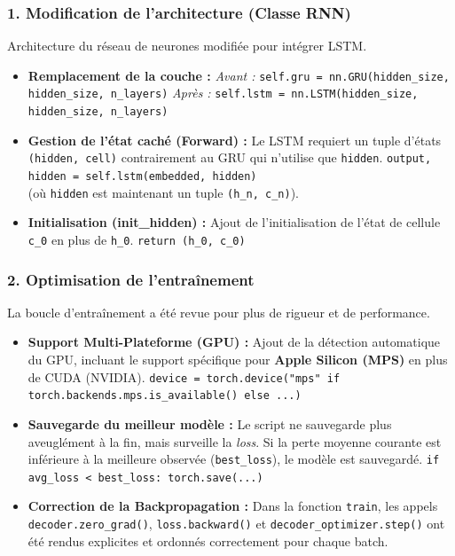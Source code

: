 \documentclass[a4paper]{article}
\begin{document}
\subsubsection{1. Modification de l'architecture (Classe RNN)}
Architecture du réseau de neurones modifiée pour intégrer LSTM.
\begin{itemize}
    \item \textbf{Remplacement de la couche :}\newline
    \textit{Avant :} \lstinline|self.gru = nn.GRU(hidden_size, hidden_size, n_layers)|\newline
    \textit{Après :} \lstinline|self.lstm = nn.LSTM(hidden_size, hidden_size, n_layers)|
    \item \textbf{Gestion de l'état caché (Forward) :}\newline
    Le LSTM requiert un tuple d'états \lstinline|(hidden, cell)| contrairement au GRU qui n'utilise que \lstinline|hidden|.\newline
    \lstinline|output, hidden = self.lstm(embedded, hidden)| \\ (où \lstinline|hidden| est maintenant un tuple \lstinline|(h_n, c_n)|).
    \item \textbf{Initialisation (init\_hidden) :}\newline
    Ajout de l'initialisation de l'état de cellule \lstinline|c_0| en plus de \lstinline|h_0|.\newline
    \lstinline|return (h_0, c_0)|
\end{itemize}

\subsubsection{2. Optimisation de l'entraînement}
La boucle d'entraînement a été revue pour plus de rigueur et de performance.
\begin{itemize}
    \item \textbf{Support Multi-Plateforme (GPU) :}\newline
    Ajout de la détection automatique du GPU, incluant le support spécifique pour \textbf{Apple Silicon (MPS)} en plus de CUDA (NVIDIA).\newline
    \lstinline|device = torch.device("mps" if torch.backends.mps.is_available() else ...)|
    \item \textbf{Sauvegarde du meilleur modèle :}\newline
    Le script ne sauvegarde plus aveuglément à la fin, mais surveille la \textit{loss}. Si la perte moyenne courante est inférieure à la meilleure observée (\lstinline|best_loss|), le modèle est sauvegardé.\newline
    \lstinline|if avg_loss < best_loss: torch.save(...)|
    \item \textbf{Correction de la Backpropagation :}\newline
    Dans la fonction \lstinline|train|, les appels \lstinline|decoder.zero_grad()|, \lstinline|loss.backward()| et \lstinline|decoder_optimizer.step()| ont été rendus explicites et ordonnés correctement pour chaque batch.
\end{itemize}
\end{document}
